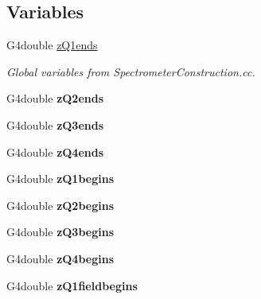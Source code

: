 \subsection*{Variables}
\begin{DoxyCompactItemize}
\item 
\hypertarget{EMFieldDebugger_8hh_a8825e4bac9c627d0fc56ceb808baee99}{G4double \hyperlink{EMFieldDebugger_8hh_a8825e4bac9c627d0fc56ceb808baee99}{z\-Q1ends}}\label{EMFieldDebugger_8hh_a8825e4bac9c627d0fc56ceb808baee99}

\begin{DoxyCompactList}\small\item\em Global variables from Spectrometer\-Construction.\-cc. \end{DoxyCompactList}\item 
\hypertarget{EMFieldDebugger_8hh_a0389aed4a205ff7970a9c57db9776625}{G4double {\bfseries z\-Q2ends}}\label{EMFieldDebugger_8hh_a0389aed4a205ff7970a9c57db9776625}

\item 
\hypertarget{EMFieldDebugger_8hh_aa309293d04a3e9edd55505001bb8842f}{G4double {\bfseries z\-Q3ends}}\label{EMFieldDebugger_8hh_aa309293d04a3e9edd55505001bb8842f}

\item 
\hypertarget{EMFieldDebugger_8hh_aaefdf69418ceee3aabc72a346eef1799}{G4double {\bfseries z\-Q4ends}}\label{EMFieldDebugger_8hh_aaefdf69418ceee3aabc72a346eef1799}

\item 
\hypertarget{EMFieldDebugger_8hh_a63b4d37f848ab857400025988ebc68ac}{G4double {\bfseries z\-Q1begins}}\label{EMFieldDebugger_8hh_a63b4d37f848ab857400025988ebc68ac}

\item 
\hypertarget{EMFieldDebugger_8hh_a62d0de84d7d6b0923e982b354afad285}{G4double {\bfseries z\-Q2begins}}\label{EMFieldDebugger_8hh_a62d0de84d7d6b0923e982b354afad285}

\item 
\hypertarget{EMFieldDebugger_8hh_a12daa717eecd47b0ce06c1314040fc3c}{G4double {\bfseries z\-Q3begins}}\label{EMFieldDebugger_8hh_a12daa717eecd47b0ce06c1314040fc3c}

\item 
\hypertarget{EMFieldDebugger_8hh_ab2b8c71527a18e35d81eb8bd6e7691f4}{G4double {\bfseries z\-Q4begins}}\label{EMFieldDebugger_8hh_ab2b8c71527a18e35d81eb8bd6e7691f4}

\item 
\hypertarget{EMFieldDebugger_8hh_aad92ec801d3e4699e64b73238d977d97}{G4double {\bfseries z\-Q1fieldbegins}}\label{EMFieldDebugger_8hh_aad92ec801d3e4699e64b73238d977d97}


\end{DoxyCompactItemize}
